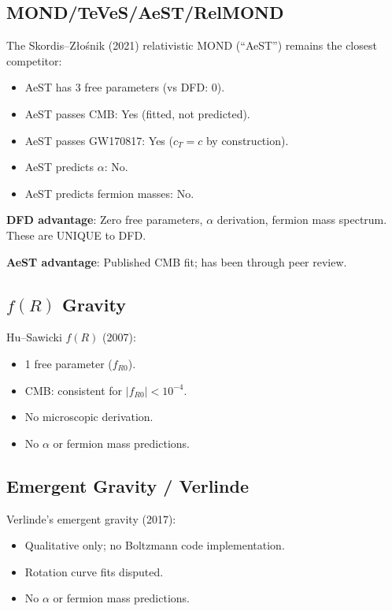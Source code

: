 \documentclass[11pt,a4paper]{article}
\begin{document}
\subsection{MOND/TeVeS/AeST/RelMOND}

The Skordis--Z\l o\'snik (2021) relativistic MOND (``AeST'') remains the closest competitor:
\begin{itemize}
\item AeST has 3 free parameters (vs DFD: 0).
\item AeST passes CMB: Yes (fitted, not predicted).
\item AeST passes GW170817: Yes ($c_T = c$ by construction).
\item AeST predicts $\alpha$: No.
\item AeST predicts fermion masses: No.
\end{itemize}

\textbf{DFD advantage}: Zero free parameters, $\alpha$ derivation, fermion mass spectrum. These are UNIQUE to DFD.

\textbf{AeST advantage}: Published CMB fit; has been through peer review.

\subsection{$f(R)$ Gravity}

Hu--Sawicki $f(R)$ (2007):
\begin{itemize}
\item 1 free parameter ($f_{R0}$).
\item CMB: consistent for $|f_{R0}| < 10^{-4}$.
\item No microscopic derivation.
\item No $\alpha$ or fermion mass predictions.
\end{itemize}

\subsection{Emergent Gravity / Verlinde}

Verlinde's emergent gravity (2017):
\begin{itemize}
\item Qualitative only; no Boltzmann code implementation.
\item Rotation curve fits disputed.
\item No $\alpha$ or fermion mass predictions.
\end{itemize}
\end{document}
